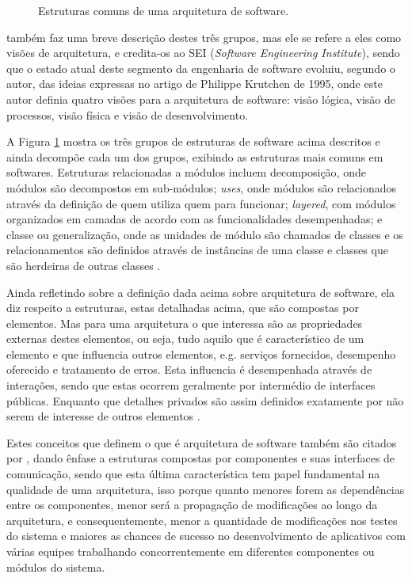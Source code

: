 \documentclass[diss]{template/setrem}
\begin{document}
\begin{figure}[!h]
    \caption{Estruturas comuns de uma arquitetura de software.}
    \label{fig:architecture-structure}
\end{figure}

\citet{Gorton2011} também faz uma breve descrição destes três grupos, mas ele se refere a eles como visões de arquitetura, e credita-os ao SEI (\emph{Software Engineering Institute}), sendo que o estado atual deste segmento da engenharia de software evoluiu, segundo o autor, das ideias expressas no artigo de Philippe Krutchen de 1995, onde este autor definia quatro visões para a arquitetura de software: visão lógica, visão de processos, visão física e visão de desenvolvimento.

A Figura \ref{fig:architecture-structure} mostra os três grupos de estruturas de software acima descritos e ainda decompõe cada um dos grupos, exibindo as estruturas mais comuns em softwares. Estruturas relacionadas a módulos incluem decomposição, onde módulos são decompostos em sub-módulos; \emph{uses}, onde módulos são relacionados através da definição de quem utiliza quem para funcionar;  \emph{layered}, com módulos organizados em camadas de acordo com as funcionalidades desempenhadas; e classe ou generalização, onde as unidades de módulo são chamados de classes e os relacionamentos são definidos através de instâncias de uma classe e classes que são herdeiras de outras classes \citep{Bass2003}.

Ainda refletindo sobre a definição dada acima sobre arquitetura de software, ela diz respeito a estruturas, estas detalhadas acima, que são compostas por elementos. Mas para uma arquitetura o que interessa são as propriedades externas destes elementos, ou seja, tudo aquilo que é característico de um elemento e que influencia outros elementos, e.g. serviços fornecidos, desempenho oferecido e tratamento de erros. Esta influencia é desempenhada através de interações, sendo que estas ocorrem geralmente por intermédio de interfaces públicas. Enquanto que detalhes privados são assim definidos exatamente por não serem de interesse de outros elementos \citep{Bass2003}.

Estes conceitos que definem o que é arquitetura de software também são citados por \citet{Gorton2011}, dando ênfase a estruturas compostas por componentes e suas interfaces de comunicação, sendo que esta última característica tem papel fundamental na qualidade de uma arquitetura, isso porque quanto menores forem as dependências entre os componentes, menor será a propagação de modificações ao longo da arquitetura, e consequentemente, menor a quantidade de modificações nos testes do sistema e maiores as chances de sucesso no desenvolvimento de aplicativos com várias equipes trabalhando concorrentemente em diferentes componentes ou módulos do sistema.
\end{document}
